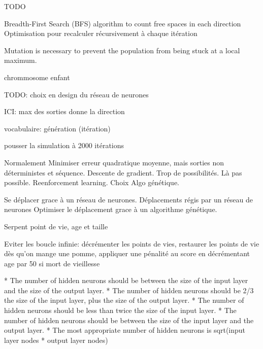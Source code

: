 \documentclass[10pt]{beamer}
\begin{document}
\begin{frame}
  TODO

  Breadth-First Search (BFS) algorithm to count free spaces in each direction
  Optimisation pour recalculer récursivement à chaque itération

  Mutation is necessary to prevent the population from being stuck at a local maximum.

  chrommosome enfant

  TODO: choix en design du réseau de neurones

  ICI: max des sorties donne la direction

  vocabulaire: génération (itération)

  pousser la simulation à 2000 itérations

  Normalement Minimiser erreur quadratique moyenne, mais sorties non déterministes et séquence.
  Descente de gradient.
  Trop de possibilités.
  Là pas possible.
  Reenforcement learning.
  Choix Algo génétique.

  Se déplacer grace à un réseau de neurones.
  Déplacements régis par un réseau de neurones
  Optimiser le déplacement grace à un algorithme génétique.

  Serpent point de vie, age et taille

  Eviter les boucle infinie: décrémenter les points de vies, restaurer les points de vie dès qu'on mange une pomme, appliquer une pénalité au score en décrémentant age par 50 si mort de vieillesse

  * The number of hidden neurons should be between the size of the input layer and the size of the output layer.
  * The number of hidden neurons should be 2/3 the size of the input layer, plus the size of the output layer.
  * The number of hidden neurons should be less than twice the size of the input layer.
  * The number of hidden neurons should be between the size of the input layer and the output layer.
  * The most appropriate number of hidden neurons is sqrt(input layer nodes * output layer nodes)
  \end{frame}
\end{document}
